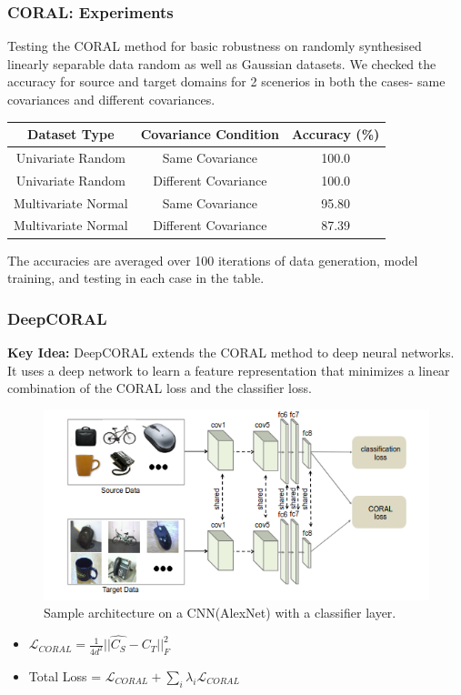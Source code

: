 \documentclass{beamer}
\begin{document}
\begin{frame}
    \frametitle{CORAL: Experiments}
        Testing the CORAL method for basic robustness on randomly synthesised linearly separable data random as well as Gaussian datasets. We checked the accuracy for source and target domains for 2 scenerios in both the cases- same covariances and different covariances.\\
 
        \begin{table}
        \begin{tabular}{ccc}
            \toprule
            \textbf{Dataset Type} & \textbf{Covariance Condition} & \textbf{Accuracy (\%)} \\
            \midrule
            Univariate Random & Same Covariance & 100.0 \\
            Univariate Random & Different Covariance & 100.0 \\
            Multivariate Normal & Same Covariance & 95.80 \\
            Multivariate Normal & Different Covariance & 87.39 \\
            \bottomrule
          \end{tabular}
        \end{table}
        The accuracies are averaged over 100 iterations of data generation, model training, and testing in each case in the table.
    \end{frame}
 
\begin{frame}
    \frametitle{DeepCORAL}
    \textbf{Key Idea:} DeepCORAL extends the CORAL method to deep neural networks. It uses a deep network to learn a feature representation that minimizes a linear combination of the CORAL loss and the classifier loss.
 
    \begin{figure}[h]
        \centering
        \includegraphics[width=0.9\linewidth, height=0.3\textwidth]{images/DeepCORAL/DeepCORAL.png}
        \caption{ Sample architecture on a CNN(AlexNet) with a classifier layer.}
    \end{figure}
    \begin{itemize}
    \item $\mathcal{L}_{CORAL} = \frac{1}{4d^2}||\widehat{C_S} - C_T||_F^2$
    \item Total Loss = $\mathcal{L}_{CORAL} + \sum_i\lambda_i\mathcal{L}_{CORAL}$
    \end{itemize}
\end{frame}
 
\end{document}
